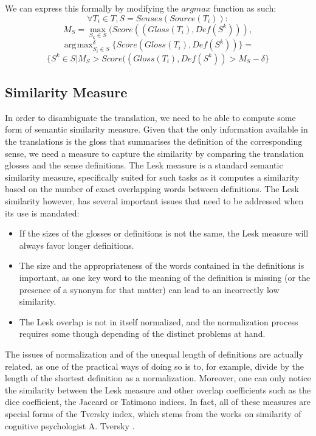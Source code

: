 \documentclass[10pt, a4paper]{article}
\DeclareMathOperator*{\argmax}{arg\!\max}
\begin{document}
We can express this formally by modifying the \(argmax\) function as such:
\[
\forall T_i \in T, S=Senses(Source(T_i)): 
\]
\[
M_S = \max_{S_k\in S}(Score((Gloss(T_i),Def(S^k))),
\]
\[
\argmax_{S_i\in S}^\delta \{Score(Gloss(T_i),Def(S^k))\}=
\]
\[
\{S^k\in S|  M_S > Score((Gloss(T_i),Def(S^k)) > M_S-\delta \}
\]

\subsection{Similarity Measure}
In order to disambiguate the translation, we need to be able to compute some form of semantic similarity measure. Given that the only information available in the translations is the gloss that summarises the definition of the corresponding sense, we need a measure to capture the similarity by comparing the translation glosses and the sense definitions. The Lesk \cite{citeulike:625530} measure is a standard semantic similarity measure, specifically suited for such tasks as it computes a similarity based on the number of exact overlapping words between definitions. The Lesk similarity however, has several important issues that need to be addressed when its use is mandated: 
\begin{itemize}
	\item If the sizes of the glosses or definitions is not the same, the Lesk measure will always favor longer definitions.
	\item The size and the appropriateness of the words contained in the definitions is important, as one key word to the meaning of the definition is missing (or the presence of a synonym for that matter) can lead to an incorrectly low similarity.
	\item The Lesk overlap is not in itself normalized, and the normalization process requires some though depending of the distinct problems at hand.
\end{itemize}
 
 The issues of normalization and of the unequal length of definitions are actually related, as one of the practical ways of doing so is to, for example, divide by the length of the shortest definition as a normalization. Moreover, one can only notice the similarity between the Lesk measure and other overlap coefficients such as the dice coefficient, the Jaccard or Tatimono indices. In fact, all of these measures are special forms of the Tversky index, which stems from the works on similarity of cognitive psychologist A. Tversky \cite{tversky77similarity}.
\end{document}
